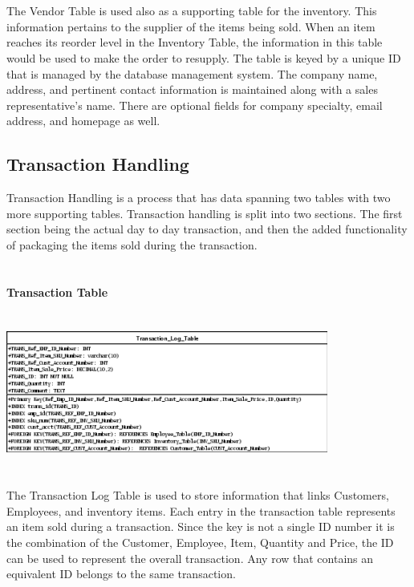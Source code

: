 \documentclass{report}
\begin{document}
        \\
        \\
        The Vendor Table is used also as a supporting table for the inventory. This information
        pertains to the supplier of the items being sold. When an item reaches its reorder level
        in the Inventory Table, the information in this table would be used to make the order to
        resupply. The table is keyed by a unique ID that is managed by the database management
        system. The company name, address, and pertinent contact information is maintained along
        with a sales representative's name. There are optional fields for company specialty, email
        address, and homepage as well.


	\newpage
        \subsection{Transaction Handling}

        Transaction Handling is a process that has data spanning two tables with two more supporting
        tables. Transaction handling is split into two sections. The first section being the actual
        day to day transaction, and then the added functionality of packaging the items sold during
        the transaction.\\
        \\
        \\
        {\bf Transaction Table}\\
        \\
        \\
        \includegraphics{Tables/TransactionLogTable.png}\\
        \\
        \\
        The Transaction Log Table is used to store information that links Customers, Employees, and
        inventory items. Each entry in the transaction table represents an item sold during a transaction.
        Since the key is not a single ID number it is the combination of the Customer, Employee, Item,
        Quantity and Price, the ID can be used to represent the overall transaction. Any row that contains
        an equivalent ID belongs to the same transaction.
        \\
        \\
\end{document}
